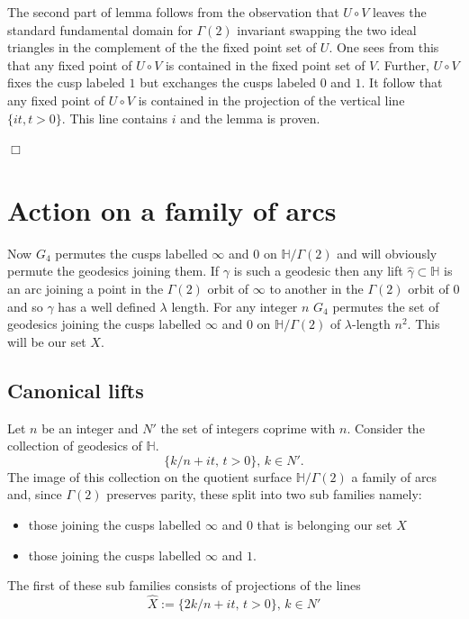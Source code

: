 \documentclass[12pt,a4paper]{amsart}
\def\HH{\mathbb{H}}
\def\KK{G_4}
\def\xx{\HH/g2}
\def\g2{\Gamma(2)}
\def\xx{\HH/\g2}
\begin{document}
\proof 



The second part of lemma follows from the observation that 
$U\circ V$ leaves the standard fundamental domain for $\g2$
invariant swapping the two ideal triangles in the complement
of the the fixed point set of $U$.
One sees from this that any fixed point
of $U\circ V$ is contained in the fixed point set of $V$.
Further, $U\circ V$ fixes the cusp labeled $1$
but exchanges the cusps labeled $0$ and $1$.
It follow that any fixed point of $U \circ V$
is contained in the projection of the vertical 
line $\{ it, t >0 \}$.
This line contains $i$ and the lemma is proven.

\hfill $\Box$

\section{Action on a family of arcs}

Now $\KK$ permutes the cusps labelled $\infty$ and $0$  on $\xx$
and will obviously permute the geodesics joining them.
If $\gamma$ is such a geodesic then
any  lift
$\hat{\gamma} \subset \HH$ is an arc joining a point in the 
$\g2$ orbit of $\infty$ to another in the  $\g2$ orbit of $0$
and so $\gamma$ has a well defined $\lambda$ length.
For any integer $n$ $\KK$  permutes the set of geodesics joining the 
cusps labelled $\infty$ and $0$  on $\xx$
of $\lambda$-length $n^2$.
This will be our set $X$.


\subsection{Canonical lifts}

Let $n$ be an integer and 
$N'$  the set of integers coprime with $n$.
Consider the collection of geodesics of $\HH$.
$$\{  k/n+ i t,\, t>0  \},\, k \in N'.$$
The image of this collection on the quotient surface $\xx$ a family of arcs
and, since $\Gamma(2)$ preserves parity, these split into two sub families namely:
\begin{itemize}
\item those joining the cusps labelled $\infty$ and $0$ that is belonging our set $X$
\item those joining the cusps labelled $\infty$ and $1$.
\end{itemize}
The first of these sub families consists of projections of the lines
$$\hat{X} :=  \{  2k/n+ i t,\, t >0 \},\, k \in N'$$
\end{document}
